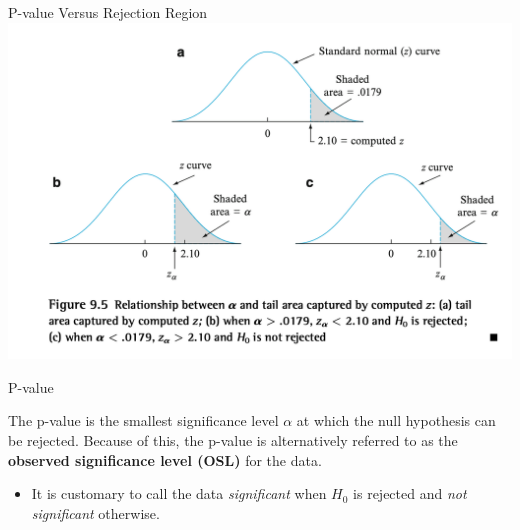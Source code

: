 \documentclass[
  ignorenonframetext,
]{beamer}
\providecommand{\tightlist}{%
  \setlength{\itemsep}{0pt}\setlength{\parskip}{0pt}}\usepackage{longtable,booktabs,array}
\begin{document}
\begin{frame}{P-value Versus Rejection Region}
\protect\hypertarget{p-value-versus-rejection-region}{}
\includegraphics{images/p-value.png}
\end{frame}

\begin{frame}{P-value}
\protect\hypertarget{p-value-2}{}
\begin{tcolorbox}[enhanced jigsaw, left=2mm, breakable, bottomrule=.15mm, colframe=quarto-callout-important-color-frame, arc=.35mm, leftrule=.75mm, colbacktitle=quarto-callout-important-color!10!white, titlerule=0mm, opacityback=0, coltitle=black, opacitybacktitle=0.6, colback=white, toprule=.15mm, toptitle=1mm, bottomtitle=1mm, title=\textcolor{quarto-callout-important-color}{\faExclamation}\hspace{0.5em}{Proposition}, rightrule=.15mm]

The p-value is the smallest significance level \(\alpha\) at which the
null hypothesis can be rejected. Because of this, the p-value is
alternatively referred to as the \textbf{observed significance level
(OSL)} for the data.

\end{tcolorbox}

\begin{itemize}[<+->]
\tightlist
\item
  It is customary to call the data \emph{significant} when \(H_{0}\) is
  rejected and \emph{not significant} otherwise.
\end{itemize}
\end{frame}
\end{document}
